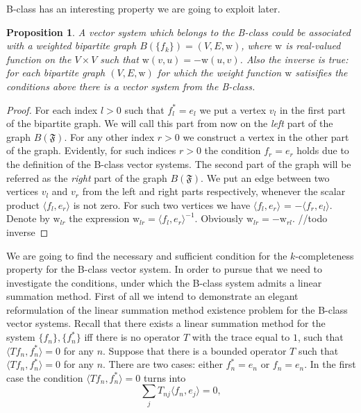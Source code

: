 \documentclass[12pt]{article}
\newcommand\inner[2]{\langle #1, #2 \rangle}
\newtheorem{prop}{Proposition}
\theoremstyle{definition}
\newcommand{\fsys}{\mathfrak{F}}
\newcommand{\wt}{\mathrm{w}}
\numberwithin{remark}{section}
\numberwithin{theorem}{section}
\numberwithin{prop}{section}
\numberwithin{equation}{section}
\numberwithin{lemma}{section}
\numberwithin{prop_under_lemma}{lemma}
\begin{document}
    B-class has an interesting property we are going to exploit later.
    \begin{prop}
        A vector system which belongs to the B-class could be associated with a 
        weighted bipartite graph $B(\{f_k\}) = (V, E, \wt)$, where $\wt$ is real-valued function on the $V\times V$ such that
        $\wt(v, u) = -\wt(u, v)$.
        Also the inverse is true: for each bipartite graph $(V, E, \wt)$ for which the weight function
        $\wt$ satisifies the conditions above there is a vector system from the B-class.
    \end{prop}
    \begin{proof}
        For each index $l > 0$ such that $f^*_l = e_l$ we put a vertex $v_l$ in the first part of the bipartite graph.
        We will call this part from now on the \textit{left} part of the graph $B(\fsys)$.
        For any other index $r > 0$ we construct a vertex in the other part of the graph.
        Evidently, for such indices $r > 0$ the condition $f_r = e_r$ holds due to the definition of the B-class vector systems.
        The second part of the graph will be referred as the \textit{right} part of the graph $B(\fsys)$.
        We put an edge between two vertices $v_l$ and $v_r$ from the left and right parts respectively,
        whenever the scalar product $\inner{f_l}{e_r}$ is not zero.
        For such two vertices we have $\inner{f_l}{e_r}$ = $-\inner{f_r}{e_l}$.
        Denote by $\wt_{lr}$ the expression $\wt_{lr} = \inner{f_l}{e_r}^{-1}$.
        Obviously $\wt_{lr} = -\wt_{rl}$.
        //todo inverse
    \end{proof}
    We are going to find the necessary and sufficient condition for the $k$-completeness property for the B-class vector system.
    In order to pursue that we need to investigate the conditions, under which the B-class system admits a linear summation method.
    First of all we intend to demonstrate an elegant reformulation of the linear summation method existence problem for
    the B-class vector systems.
    Recall that there exists a linear summation method for the system $\{f_n\}, \{f^*_n\}$
    iff there is no operator $T$ with the trace equal to $1$, such that $\inner{Tf_n}{f_n^*} = 0$ for any $n$.
    Suppose that there is a bounded operator $T$ such that $\inner{Tf_n}{f_n^*} = 0$ for any $n$.
    There are two cases: either $f^*_n = e_n$ or $f_n = e_n$.
    In the first case the condition $\inner{Tf_n}{f_n^*} = 0$ turns into
    \begin{equation}
        \label{left-eqn}
        \sum_j T_{nj} \inner{f_n}{e_j} = 0,
    \end{equation}
\end{document}
